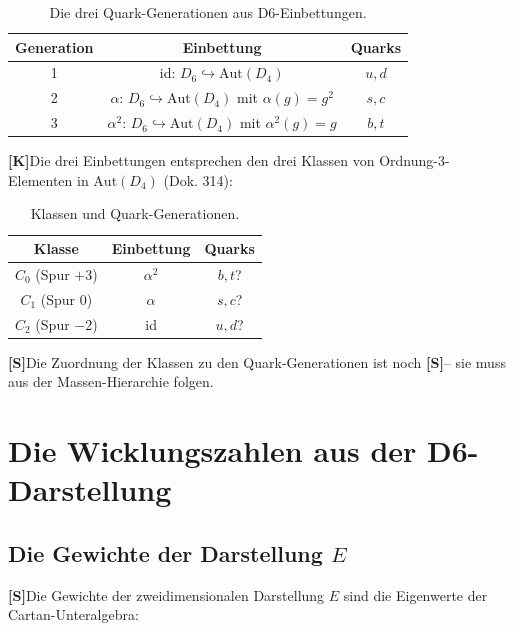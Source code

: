 \documentclass[11pt,a4paper]{article}
\newcommand{\Kstatus}{\textbf{[K]}}
\newcommand{\Sstatus}{\textbf{[S]}}
\begin{document}
	\begin{table}[h!]
		\centering
		\caption{Die drei Quark-Generationen aus D6-Einbettungen.}
		\label{tab:quark_generations}
		\begin{tabular}{c c c}
			\toprule
			\textbf{Generation} & \textbf{Einbettung} & \textbf{Quarks} \\
			\midrule
			1 & id: $D_6 \hookrightarrow \text{Aut}(D_4)$ & $u, d$ \\
			2 & $\alpha$: $D_6 \hookrightarrow \text{Aut}(D_4)$ mit $\alpha(g) = g^2$ & $s, c$ \\
			3 & $\alpha^2$: $D_6 \hookrightarrow \text{Aut}(D_4)$ mit $\alpha^2(g) = g$ & $b, t$ \\
			\bottomrule
		\end{tabular}
	\end{table}
	
	\Kstatus Die drei Einbettungen entsprechen den drei Klassen von Ordnung-3-Elementen in $\text{Aut}(D_4)$ (Dok. 314):
	
	\begin{table}[h!]
		\centering
		\caption{Klassen und Quark-Generationen.}
		\label{tab:classes_generations}
		\begin{tabular}{c c c}
			\toprule
			\textbf{Klasse} & \textbf{Einbettung} & \textbf{Quarks} \\
			\midrule
			$C_0$ (Spur $+3$) & $\alpha^2$ & $b, t$? \\
			$C_1$ (Spur $0$) & $\alpha$ & $s, c$? \\
			$C_2$ (Spur $-2$) & id & $u, d$? \\
			\bottomrule
		\end{tabular}
	\end{table}
	
	\Sstatus Die Zuordnung der Klassen zu den Quark-Generationen ist noch \Sstatus -- sie muss aus der Massen-Hierarchie folgen.
	
	\section{Die Wicklungszahlen aus der D6-Darstellung}
	
	\subsection{Die Gewichte der Darstellung $E$}
	
	\Sstatus Die Gewichte der zweidimensionalen Darstellung $E$ sind die Eigenwerte der Cartan-Unteralgebra:
	
\end{document}
